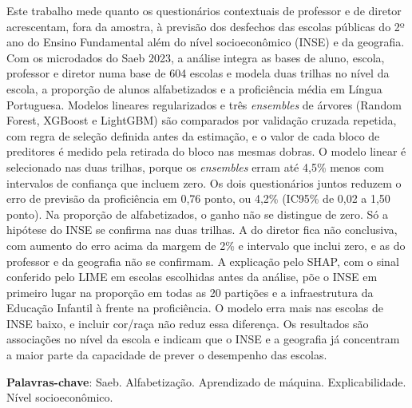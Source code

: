 

\newcommand\Curso{Ciência de Dados para Negócios}




\pretextual



\begin{resumo}
Este trabalho mede quanto os questionários contextuais de professor e de
diretor acrescentam, fora da amostra, à previsão dos desfechos das escolas
públicas do 2º ano do Ensino Fundamental além do nível socioeconômico
(INSE) e da geografia. Com os microdados do Saeb 2023, a análise integra as
bases de aluno, escola, professor e diretor numa base de 604 escolas e
modela duas trilhas no nível da escola, a proporção de alunos alfabetizados
e a proficiência média em Língua Portuguesa. Modelos lineares regularizados
e três \textit{ensembles} de árvores (Random Forest, XGBoost e LightGBM) são
comparados por validação cruzada repetida, com regra de seleção definida
antes da estimação, e o valor de cada bloco de preditores é medido pela
retirada do bloco nas mesmas dobras. O modelo linear é selecionado nas duas
trilhas, porque os \textit{ensembles} erram até 4,5\% menos com intervalos
de confiança que incluem zero. Os dois questionários juntos reduzem o erro
de previsão da proficiência em 0,76 ponto, ou 4,2\% (IC95\% de 0,02 a 1,50
ponto). Na proporção de alfabetizados, o ganho não se distingue de zero. Só
a hipótese do INSE se confirma nas duas trilhas. A do diretor fica não
conclusiva, com aumento do erro acima da margem de 2\% e intervalo que
inclui zero, e as do professor e da geografia não se confirmam.
A explicação pelo SHAP, com o sinal conferido pelo LIME em escolas escolhidas antes da
análise, põe o INSE em primeiro lugar na proporção em todas as 20 partições
e a infraestrutura da Educação Infantil à frente na proficiência. O modelo
erra mais nas escolas de INSE baixo, e incluir cor/raça não reduz essa
diferença. Os resultados são associações no nível da escola e indicam que o
INSE e a geografia já concentram a maior parte da capacidade de prever o
desempenho das escolas.

\vspace{\onelineskip}
\noindent\textbf{Palavras-chave}: Saeb. Alfabetização. Aprendizado de máquina. Explicabilidade. Nível socioeconômico.
\end{resumo}

